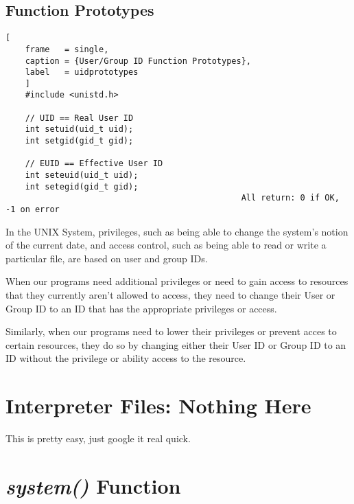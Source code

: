 \documentclass{article}
\newcommand\be[1]{\textbf{\emph{#1}}}
\begin{document}
\subsection{Function Prototypes}
\begin{lstlisting}[
    frame   = single,
    caption = {User/Group ID Function Prototypes},
    label   = uidprototypes
    ]
    #include <unistd.h>

    // UID == Real User ID
    int setuid(uid_t uid);
    int setgid(gid_t gid);

    // EUID == Effective User ID
    int seteuid(uid_t uid);
    int setegid(gid_t gid);
                                                All return: 0 if OK, -1 on error
\end{lstlisting}
In the UNIX System, privileges, such as being able to change the system's notion
of the current date, and access control, such as being able to read or write a particular 
file, are based on user and group IDs. \newline

When our programs need additional privileges or need to gain access to resources that 
they currently aren't allowed to access, they need to change their User or Group ID 
to an ID that has the appropriate privileges 
or access. \newline

Similarly, when our programs need to lower their privileges or prevent acces to certain
resources, they do so by changing either their User ID or Group ID to an ID without
the privilege or ability access to the resource. \newline

\section{Interpreter Files: Nothing Here}
This is pretty easy, just google it real quick.
\section{\be{system()} Function}
\end{document}
